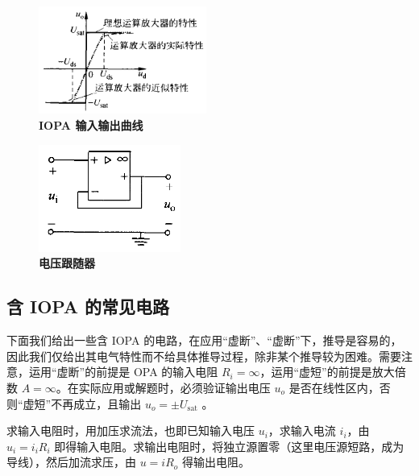 \documentclass[UTF8]{report}
\theoremstyle{MyLineTheoremStyle} %
\theoremstyle{MyBlockTheoremStyle} %
\theoremstyle{MySubsubsectionStyle} %
\begin{document}
\begin{center}\noindent\begin{minipage}{0.4\textwidth}
        \begin{figure}[H]\centering
            \includegraphics[height=100pt]{assets/1,2/4323bb51980c2d4d8e127dfa2e8110d0.png}
            \caption{\textbf{IOPA 输入输出曲线}}\label{IOPA 输入输出曲线}
        \end{figure}
    \end{minipage}\begin{minipage}{0.49\textwidth}
        \begin{figure}[H]\centering
            \includegraphics[height=100pt]{assets/1,2/电压跟随器.png}
            \caption{\textbf{电压跟随器}}\label{电压跟随器}
        \end{figure}
\end{minipage}\end{center}

\subsection{含 IOPA 的常见电路}
下面我们给出一些含 IOPA 的电路，在应用“虚断”、“虚断”下，推导是容易的，因此我们仅给出其电气特性而不给具体推导过程，除非某个推导较为困难。需要注意，运用“虚断”的前提是 OPA 的输入电阻 $R_{i} = \infty$，运用“虚短”的前提是放大倍数 $A = \infty$。在实际应用或解题时，必须验证输出电压 $u_o$ 是否在线性区内，否则“虚短”不再成立，且输出  $u_o = \pm U_{\text{sat}}$ 。

求输入电阻时，用加压求流法，也即已知输入电压 $u_i$，求输入电流 $i_{i}$，由 $u_i = i_iR_i$ 即得输入电阻。求输出电阻时，将独立源置零（这里电压源短路，成为导线），然后加流求压，由 $u = iR_o$ 得输出电阻。

\end{document}
